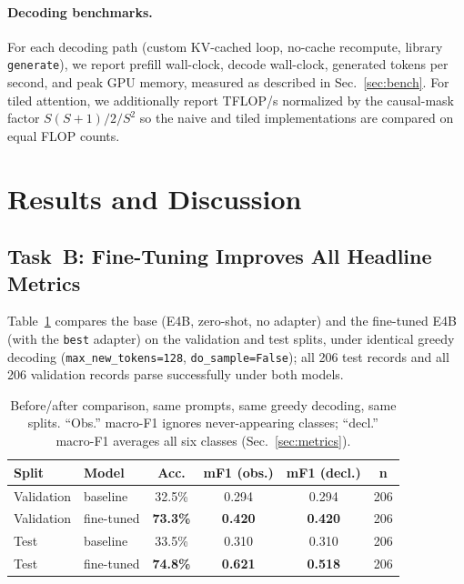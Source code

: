 \documentclass[conference]{IEEEtran}
\newcommand{\code}[1]{\texttt{\small #1}}
\begin{document}
\paragraph*{Decoding benchmarks.}
For each decoding path (custom KV-cached loop, no-cache
recompute, library \code{generate}), we report prefill wall-clock,
decode wall-clock, generated tokens per second,
and peak GPU memory, measured as described in
Sec.~\ref{sec:bench}. For tiled attention, we additionally
report TFLOP/s normalized by the causal-mask factor
$S(S+1)/2 / S^2$ so the naive and tiled implementations are
compared on equal FLOP counts.

\section{Results and Discussion}
\label{sec:results}

\subsection{Task~B: Fine-Tuning Improves All Headline Metrics}
\label{sec:supervised}

Table~\ref{tab:headline} compares the base
(E4B, zero-shot, no adapter) and the fine-tuned E4B (with the
\code{best} adapter) on the validation and test splits, under
identical greedy decoding (\code{max\_new\_tokens=128},
\code{do\_sample=False}); all 206 test records and all 206
validation records parse successfully under both models.

\begin{table}[t]
\caption{Before/after comparison, same prompts, same greedy decoding,
same splits. ``Obs.'' macro-F1 ignores never-appearing classes;
``decl.'' macro-F1 averages all six classes (Sec.~\ref{sec:metrics}).}
\label{tab:headline}
\centering
\small
\begin{tabular}{llcccc}
\toprule
\textbf{Split} & \textbf{Model} & \textbf{Acc.} &
\textbf{mF1 (obs.)} & \textbf{mF1 (decl.)} & \textbf{n}\\
\midrule
Validation & baseline & 32.5\% & 0.294 & 0.294 & 206\\
Validation & fine-tuned & \textbf{73.3\%} & \textbf{0.420} &
\textbf{0.420} & 206\\
\midrule
Test & baseline & 33.5\% & 0.310 & 0.310 & 206\\
Test & fine-tuned & \textbf{74.8\%} & \textbf{0.621} & \textbf{0.518} & 206\\
\bottomrule
\end{tabular}
\end{table}
\end{document}
